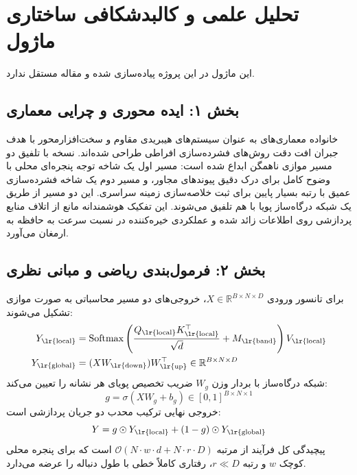 \section{تحلیل علمی و کالبدشکافی ساختاری ماژول }

این ماژول در این پروژه پیاده‌سازی شده و مقاله مستقل ندارد.
\label{sec:aegis_v5}

\subsection*{بخش ۱: ایده محوری و چرایی معماری }
خانواده معماری‌های  به عنوان سیستم‌های هیبریدی مقاوم و سخت‌افزارمحور با هدف جبران افت دقت روش‌های فشرده‌سازی افراطی طراحی شده‌اند. نسخه  با تلفیق دو مسیر موازی ناهمگن ابداع شده است: مسیر اول یک شاخه توجه پنجره‌ای محلی  با وضوح کامل برای درک دقیق پیوندهای مجاور، و مسیر دوم یک شاخه فشرده‌سازی عمیق با رتبه بسیار پایین  برای ثبت خلاصه‌سازی زمینه سراسری. این دو مسیر از طریق یک شبکه درگاه‌ساز پویا  با هم تلفیق می‌شوند. این تفکیک هوشمندانه مانع از اتلاف منابع پردازشی روی اطلاعات زائد شده و عملکردی خیره‌کننده در نسبت سرعت به حافظه به ارمغان می‌آورد.

\subsection*{بخش ۲: فرمول‌بندی ریاضی و مبانی نظری }
برای تانسور ورودی $X \in \mathbb{R}^{B \times N \times D}$، خروجی‌های دو مسیر محاسباتی به صورت موازی تشکیل می‌شوند:
\begin{align}
Y_{\text{\lr{local}}} &= \operatorname{Softmax}\left(\frac{Q_{\text{\lr{local}}} K_{\text{\lr{local}}}^\top}{\sqrt{d}} + M_{\text{\lr{band}}}\right) V_{\text{\lr{local}}} \\
Y_{\text{\lr{global}}} &= (X W_{\text{\lr{down}}}) W_{\text{\lr{up}}}^\top \in \mathbb{R}^{B \times N \times D}
\end{align}
شبکه درگاه‌ساز با بردار وزن $W_g$ ضریب تخصیص پویای هر نشانه را تعیین می‌کند:
\begin{equation}
g = \sigma(X W_g + b_g) \in [0, 1]^{B \times N \times 1}
\end{equation}
خروجی نهایی ترکیب محدب دو جریان پردازشی است:
\begin{equation}
Y = g \odot Y_{\text{\lr{local}}} + (1 - g) \odot Y_{\text{\lr{global}}}
\end{equation}
پیچیدگی کل فرآیند از مرتبه $\mathcal{O}(N \cdot w \cdot d + N \cdot r \cdot D)$ است که برای پنجره محلی کوچک $w$ و رتبه $r \ll D$، رفتاری کاملاً خطی با طول دنباله را عرضه می‌دارد.

